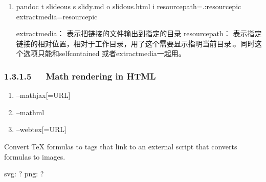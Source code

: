 \documentclass[letterpaper,12pt,english]{sphinxmanual}
\begin{document}
\begin{enumerate}
\begin{itemize}
\begin{sphinxVerbatim}[commandchars=\\\{\}]

 

  
   
\end{sphinxVerbatim}

\end{itemize}

\item {} 

\begin{sphinxVerbatim}[commandchars=\\\{\}]
pandoc \PYGZhy{}t slideous \PYGZhy{}s slidy.md \PYGZhy{}o slidous.html \PYGZhy{}i \PYGZhy{}\PYGZhy{}resource\PYGZhy{}path=.:resource\PYGZbs{}pic \PYGZhy{}\PYGZhy{}extract\PYGZhy{}media=resource\PYGZbs{}pic

\PYGZhy{}\PYGZhy{}extract\PYGZhy{}media： 表示把链接的文件输出到指定的目录
\PYGZhy{}\PYGZhy{}resource\PYGZhy{}path： 表示指定链接的相对位置，相对于工作目录，用了这个需要显示指明当前目录.。同时这个选项只能和\PYGZhy{}\PYGZhy{}self\PYGZhy{}contained 或者\PYGZhy{}\PYGZhy{}extract\PYGZhy{}media一起用。
\end{sphinxVerbatim}

\end{enumerate}


\subsubsection{1.3.1.5   Math rendering in HTML}
\label{\detokenize{001software/001install/pandoc:math-rendering-in-html}}\begin{enumerate}
%
\item {} 
–mathjax{[}=URL{]}

\item {} 
–mathml

\item {} 
–webtex{[}=URL{]}

\end{enumerate}

Convert TeX formulas to tags that link to an external script that
converts formulas to images.

svg: ? png:
?
\end{document}
